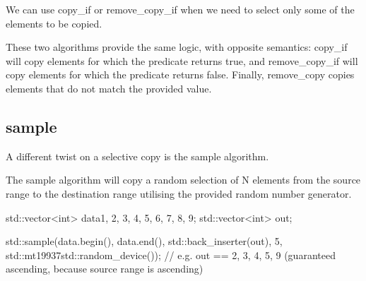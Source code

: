 We can use copy\_if or remove\_copy\_if when we need to select only some of the elements to be copied.



These two algorithms provide the same logic, with opposite semantics: copy\_if will copy elements for which the predicate returns true, and remove\_copy\_if will copy elements for which the predicate returns false. Finally, remove\_copy copies elements that do not match the provided value.

\begin{box-note}
\end{box-note}

\subsection{sample}

A different twist on a selective copy is the sample algorithm.



The sample algorithm will copy a random selection of N elements from the source range to the destination range utilising the provided random number generator.

\begin{box-note}
\begin{cppcode}
std::vector<int> data{1, 2, 3, 4, 5, 6, 7, 8, 9};
std::vector<int> out;

std::sample(data.begin(), data.end(), std::back_inserter(out),
            5, std::mt19937{std::random_device{}()});
// e.g. out == {2, 3, 4, 5, 9} (guaranteed ascending, because source range is ascending)
\end{cppcode}
\end{box-note}

